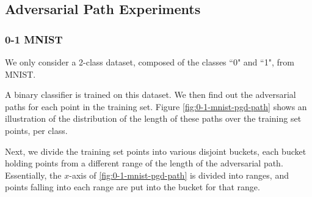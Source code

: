 \documentclass{ociamthesis}
\begin{document}
\subsection{Adversarial Path Experiments}

\subsubsection{0-1 MNIST}
    We only consider a 2-class dataset, composed of the classes ``0" and ``1",
    from MNIST.

    A binary classifier is trained on this dataset. We then find out the
    adversarial paths for each point in the training set. Figure
    \ref{fig:0-1-mnist-pgd-path} shows an illustration of the distribution of
    the length of these paths over the training set points, per class.

    Next, we divide the training set points into various disjoint buckets, each
    bucket holding points from a different range of the length of the
    adversarial path. Essentially, the $x$-axis of \ref{fig:0-1-mnist-pgd-path}
    is divided into ranges, and points falling into each range are put into the
    bucket for that range.
\end{document}
